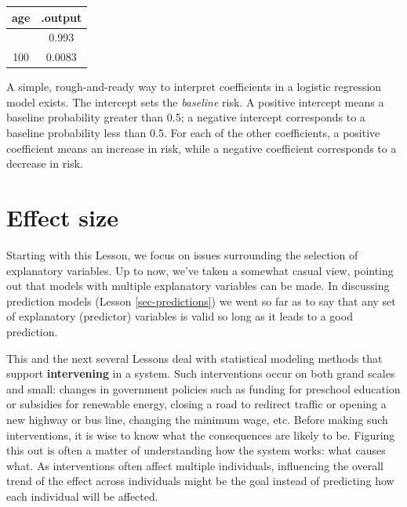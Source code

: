 \documentclass[
  letterpaper,
  DIV=11,
  numbers=noendperiod,
  oneside]{scrartcl}
\begin{document}
\begin{longtable}[]{@{}cc@{}}
\toprule\noalign{}
age & .output \\
\midrule\noalign{}
\endhead
\bottomrule\noalign{}
\endlastfoot
20 & 0.993 \\
100 & 0.0083 \\
\end{longtable}

A simple, rough-and-ready way to interpret coefficients in a logistic
regression model exists. The intercept sets the \emph{baseline} risk. A
positive intercept means a baseline probability greater than 0.5; a
negative intercept corresponds to a baseline probability less than 0.5.
For each of the other coefficients, a positive coefficient means an
increase in risk, while a negative coefficient corresponds to a decrease
in risk.

\newpage

\section{Effect size}\label{sec-effect-size}

Starting with this Lesson, we focus on issues surrounding the selection
of explanatory variables. Up to now, we've taken a somewhat casual view,
pointing out that models with multiple explanatory variables can be
made. In discussing prediction models (Lesson \ref{sec-predictions}) we
went so far as to say that any set of explanatory (predictor) variables
is valid so long as it leads to a good prediction.

This and the next several Lessons deal with statistical modeling methods
that support \textbf{intervening} in a system. Such interventions occur
on both grand scales and small: changes in government policies such as
funding for preschool education or subsidies for renewable energy,
closing a road to redirect traffic or opening a new highway or bus line,
changing the minimum wage, etc. Before making such interventions, it is
wise to know what the consequences are likely to be. Figuring this out
is often a matter of understanding how the system works: what causes
what. As interventions often affect multiple individuals, influencing
the overall trend of the effect across individuals might be the goal
instead of predicting how each individual will be affected.
\end{document}
